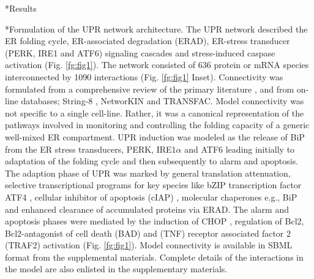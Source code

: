 \documentclass[12pt]{article}
\makeatletter
\renewcommand\subsection{\@startsection
	{subsection}{2}{0mm}
	{-0.05in}
	{-0.5\baselineskip}
	{\normalfont\normalsize\bfseries}}
\renewcommand\section{\@startsection
	{subsection}{2}{0mm}
	{-0.2in}
	{0.05\baselineskip}
	{\normalfont\large\bfseries}}
\makeatother
\begin{document}
\section*{Results}
\subsection*{Formulation of the UPR network architecture.}
The UPR network described the ER folding cycle, ER-associated degradation (ERAD), ER-stress transducer (PERK, IRE1 and ATF6) signaling cascades and stress-induced caspase activation (Fig. \ref{fg:fig1}). The network consisted of 636 protein or mRNA species interconnected by 1090 interactions (Fig. \ref{fg:fig1} Inset). Connectivity was formulated from a comprehensive review of the primary literature  \cite{naidoo2009er, ron2002translational, kaufman2002unfolded,ellgaard2003qce,Fonseca:2009fk,Schroder:2005vn,gotoh:hdc,mccullough2001gsc, belmont2008cga,Hetz:2009qc,Urano:2000uq,szegezdi2006mediators}, and from on-line databases; String-8 \cite{Jensen:2009fk}, NetworKIN \cite{Linding:2007fk} and TRANSFAC. Model connectivity was not specific to a single cell-line. Rather, it was a canonical representation of the pathways involved in monitoring and controlling the folding capacity of a generic well-mixed ER compartment. UPR induction was modeled as the release of BiP from the ER stress transducers, PERK, IRE1$\alpha$ and ATF6 leading initially to adaptation of the folding cycle and then subsequently to alarm and apoptosis. The adaption phase of UPR was marked by general translation attenuation, selective transcriptional programs for key species like bZIP transcription factor ATF4 \cite{lu2004tra}, cellular inhibitor of apoptosis (cIAP) \cite{hamanaka2008pdr}, molecular chaperones e.g., BiP \cite{harding2003isr} and enhanced clearance of accumulated proteins via ERAD. The alarm and apoptosis phases were mediated by the induction of CHOP \cite{ron1992cnd}, regulation of Bcl2, Bcl2-antagonist of cell death (BAD) \cite {wang1999cia} and (TNF) receptor associated factor 2 (TRAF2) \cite{lei2003jpb,putcha2003jmb, yamamoto1999bpa, szegezdi2006mediators} activation (Fig. \ref{fg:fig1}). Model connectivity is available in SBML format from the supplemental materials. Complete details of the interactions in the model are also enlisted in the supplementary materials.

\end{document}
